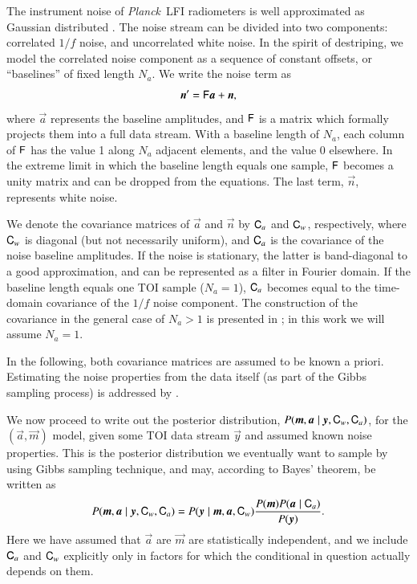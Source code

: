 \documentclass[twocolumn]{aa}
\newcommand{\ve}[1]{{\vec #1}}
\newcommand{\ma}[1]{\tens{#1}}
\newcommand{\pcal}{{P}}
\def\Planck{\textit{Planck}}
\begin{document}
The instrument noise of \Planck\ LFI radiometers is 
well approximated as Gaussian distributed \citep{Bersanelli2010}. 
The noise stream can be divided into two components: correlated $1/f$ noise,
and uncorrelated white noise.
In the spirit of destriping, we model the correlated noise component
as a sequence of constant offsets, or ``baselines'' of fixed length $N_a$.
We write the noise term as
%
\begin{equation}
  \ve{n'} = \ma{F}\ve{a}  +\ve{n},
\end{equation}
%
where $\ve{a}$ represents the baseline amplitudes, and
$\ma{F}$ is a matrix which formally projects them into a full data
stream.  With a baseline length of $N_a$, each column of $\ma{F}$ has
the value 1 along $N_a$ adjacent elements, and the value 0 elsewhere.
In the extreme limit in which the baseline length equals one sample,
$\ma{F}$ becomes a unity matrix and can be dropped from the equations.
The last term, $\ve{n}$, represents white noise. 

We denote the
covariance matrices of $\ve a$ and $\ve n$ by $\ma C_a$ and $\ma C_w$, respectively, where $\ma
C_w$ is diagonal (but not necessarily uniform), and $\ma C_a$ is the
covariance of the noise baseline amplitudes.  If the noise is
stationary, the latter is band-diagonal to a good approximation, and
can be represented as a filter in Fourier domain. If the baseline length
equals one TOI sample ($N_a=1$), $\ma C_a$ becomes equal to the
time-domain covariance of the $1/f$ noise component.  The construction
of the covariance in the general case of $N_a>1$ is presented in
\cite{keihanen2010}; in this work we will assume $N_a=1$.

In the following, both covariance matrices are assumed to be known
a priori.  Estimating the noise properties from the data itself
(as part of the Gibbs sampling process) is addressed by \citet{bp06}.

We now proceed to write out the posterior distribution, $\pcal(\ve
m,\ve a\mid \ve y, \ma C_w,\ma C_a)$, for the $(\ve a,\ve m)$ model,
given some TOI data stream $\ve y$ and assumed known noise properties.
This is the posterior distribution we eventually want to sample by
using Gibbs sampling technique, and may, according to Bayes' theorem,
be written as 
\begin{equation}
\pcal(\ve m,\ve a\mid \ve y, \ma C_w,\ma C_a) = 
\pcal(\ve y \mid \ve m,\ve a,\ma C_w) \frac{\pcal(\ve m)\pcal(\ve a \mid \ma C_a)}{\pcal (\ve y)}. 
\end{equation}
%
Here we have assumed that $\ve a$ are $\ve m$ are statistically
independent, and we include $\ma C_a$ and $\ma C_w$ explicitly only in
factors for which the conditional in question actually depends on
them.
\end{document}
